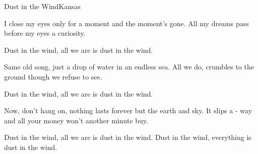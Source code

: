 \begin{song}{Dust in the Wind}{Kansas}{}



I close my eyes only for a moment and the moment's gone.
All my dreams pass before my eyes a curiosity.

Dust in the wind, all we are is dust in the wind.


Same old song, just a drop of water in an endless sea.
All we do,  crumbles to the ground though we refuse to see.

Dust in the wind, all we are is dust in the wind.



Now, don't hang on, nothing lasts forever but the earth and sky.
It slips a - way and all your money won't another minute buy.

Dust in the wind, all we are is dust in the wind.
Dust in the wind, everything is dust in the wind.

\end{song}